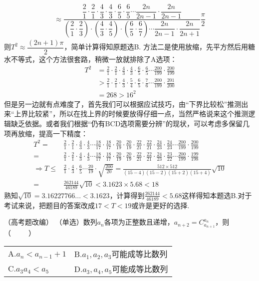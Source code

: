 \begin{solution}
\begin{align*}
        \approx\dfrac{\dfrac21\cdot\dfrac21\cdot\dfrac{4}{3}\cdot\dfrac{4}{3}\cdot\dfrac{6}{5}\cdot\dfrac{6}{5}\cdots\dfrac{2n}{2n-1}\cdot\dfrac{2n}{2n-1}}{(\dfrac{2}{1}\cdot\dfrac{2}{3})\cdot(\dfrac{4}{3}\cdot\dfrac{4}{5})\cdot(\dfrac{6}{5}\cdot\dfrac{6}{7})\cdots\dfrac{2n}{2n-1}\cdot\dfrac{2n}{2n+1}}\dfrac{\pi}{2}
    \end{align*}
则$T^2\approx\dfrac{(2n+1)\pi}{2}$，简单计算得知原题选B.
\newpage
方法二是使用放缩，先平方然后用糖水不等式，这个方法很套路，稍微一放就排除了A选项：
\begin{align*}T^{2}&=\frac{2}{1}\cdot\frac{2}{1}\cdot\frac{4}{3}\cdot\frac{4}{3}\cdot\frac{6}{5}\cdot\frac{6}{5}\cdots\frac{200}{199}\cdot\frac{200}{199}\\&>\frac{2}{1}\cdot\frac{2}{1}\cdot\frac{4}{3}\cdot\frac{5}{4}\cdot\frac{6}{5}\cdot\frac{7}{6}\cdots\frac{200}{199}\cdot\frac{201}{200}\\&=268>16^2\end{align*}
但是另一边就有点难度了，首先我们可以根据应试技巧，由“下界比较松”推测出来“上界比较紧”，所以在找上界的时候要放得仔细一点，当然严格说来这个推测逻辑缺乏依据。或者我们根据“仍有BCD选项需要分辨”的现状，可以考虑多保留几项再放缩，提高一下精度：
\begin{align*}T^2=&\frac{2}{1}\cdot\frac{2}{1}\cdot\frac{4}{3}\cdot\frac{4}{3}\cdots\frac{18}{17}\cdot\frac{18}{17}\cdot\frac{20}{19}\cdot\frac{20}{19}\cdot\frac{22}{21}\cdot\frac{22}{21}\cdot\frac{24}{23}\cdot\frac{24}{23}\cdots\frac{200}{199}\cdot\frac{200}{199}\\
    =&\frac{2}{1}\cdot\frac{2}{1}\cdot\frac{4}{3}\cdot\frac{4}{3}\cdots\frac{18}{17}\cdot\frac{18}{17}\cdot\frac{20}{19}\cdot\frac{20}{19}\cdot\frac{22}{21}\cdot\boxed{\frac{22}{21}}\cdot\frac{24}{23}\cdot\boxed{\frac{23}{22}}\cdots\frac{200}{199}\cdot\boxed{\frac{199}{198}}\\
    \Rightarrow T\leq&\frac{2}{1}\cdot\frac{4}{3}\cdot\frac{6}{5}\cdots\frac{20}{19}\cdot\sqrt{\frac{200}{20}}=\frac{512\times 512}{(15-4)(15-2)(15+2)(15+4)}\sqrt{10}\\
    =&\frac{262144}{46189}\sqrt{10}<3.1623\times5.68<18
\end{align*}
熟知$\sqrt{10}=3.16227766...<3.1623$，计算得到$\frac{262144}{46189}<5.68$这样得知本题选B.\newline 对于考试来说，把题目的答案改成$17<T<19$或许是更好的选择.
\end{solution}
\begin{example}{（高考题改编）}{}
    （单选）数列$a_{n}$各项为正整数且递增，$a_{n+2}=C_{a_{n+1}}^{a_{n}}$，则（~~~~~）

    \begin{tabular}{@{}ll@{}}
        A.$a_n<a_{n-1}+1$&B.$a_1,a_2,a_3$可能成等比数列\\
        C.$a_3a_4<a_5$&D.$a_3,a_4,a_5$可能成等比数列
    \end{tabular}
\end{example}
